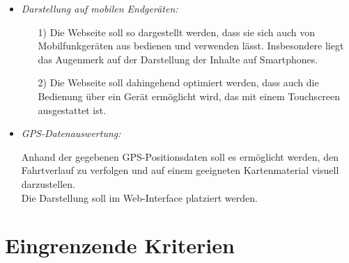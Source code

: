 \documentclass[fontsize = 12pt, paper = a4]{scrreprt}
\begin{document}
\begin{itemize}

\item \textit{Darstellung auf mobilen Endgeräten:}



\begin{itemize}

\item[1)]Die Webseite soll so dargestellt werden, dass sie sich auch von Mobilfunkgeräten aus bedienen und verwenden lässt. Insbesondere liegt das Augenmerk auf der Darstellung der Inhalte auf \glspl{Smartphone}.

\item[2)] Die Webseite soll dahingehend optimiert werden, dass auch die Bedienung über ein Gerät ermöglicht wird, das mit einem \gls{Touchscreen} ausgestattet ist.

\end{itemize}

\item \textit{\gls{GPS}-Datenauswertung:}

Anhand der gegebenen \gls{GPS}-Positionsdaten soll es ermöglicht werden, den Fahrtverlauf zu verfolgen und auf einem geeigneten Kartenmaterial visuell darzustellen. \\ Die Darstellung soll im Web-\gls{Interface} platziert werden.

\end{itemize}

\newpage


\section{Eingrenzende Kriterien}
\end{document}

